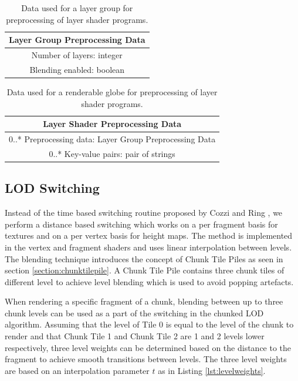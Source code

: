 \begin{table}
\centering 
\caption[]{Data used for a layer group for preprocessing of layer shader programs.}
\label{table:layergrouppreprocessingdata}
\begin{tabular}{ c }    
    	\hline
        \textbf{Layer Group Preprocessing Data} \\ 
    	\hline
	Number of layers: integer \\
    	Blending enabled: boolean \\
	\hline
\end{tabular}
\end{table}

\begin{table}
\centering
\caption[]{Data used for a renderable globe for preprocessing of layer shader programs.}
\label{table:layergrouppreprocessingdata}
\begin{tabular}{ c }
    
    	\hline
        \textbf{Layer Shader Preprocessing Data} \\ 
    	\hline
	0..* Preprocessing data: Layer Group Preprocessing Data \\
    	0..* Key-value pairs: pair of strings \\
    	\hline
    
\end{tabular}
\end{table}

\subsection{LOD Switching}
\label{section:lodswitching}
Instead of the time based switching routine proposed by Cozzi and Ring \cite{cozzi11}, we perform a distance based switching which works on a per fragment basis for textures and on a per vertex basis for height maps. The method is implemented in the vertex and fragment shaders and uses linear interpolation between levels. The blending technique introduces the concept of Chunk Tile Piles as seen in section \ref{section:chunktilepile}. A Chunk Tile Pile contains three chunk tiles of different level to achieve level blending which is used to avoid popping artefacts. 

When rendering a specific fragment of a chunk, blending between up to three chunk levels can be used as a part of the switching in the chunked LOD algorithm. Assuming that the level of Tile 0 is equal to the level of the chunk to render and that Chunk Tile 1 and Chunk Tile 2 are 1 and 2 levels lower respectively, three level weights can be determined based on the distance to the fragment to achieve smooth transitions between levels. The three level weights are based on an interpolation parameter $t$ as in Listing \ref{lst:levelweights}.

